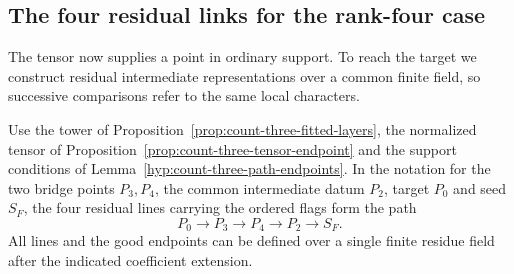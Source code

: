 \subsection{The four residual links for the rank-four case}
\label{sec:count-three-chain}

The tensor now supplies a point in ordinary support. To reach the target we construct residual intermediate representations over a common finite field, so successive comparisons refer to the same local characters.

\begin{proposition}\label{prop:count-three-residual-path}
Use the tower of Proposition~\ref{prop:count-three-fitted-layers},
the normalized tensor of Proposition~\ref{prop:count-three-tensor-endpoint}
and the support conditions of Lemma~\ref{hyp:count-three-path-endpoints}.
In the notation for the two bridge points \(P_3,P_4\), the common intermediate datum \(P_2\), target \(P_0\) and seed \(S_F\), the four residual lines carrying the ordered flags form the path 
\[
 P_0\longrightarrow P_3\longrightarrow P_4\longrightarrow P_2\longrightarrow S_F.
\]
 All lines and the good endpoints can be
defined over a single finite residue field after the indicated
coefficient extension.
\end{proposition}

